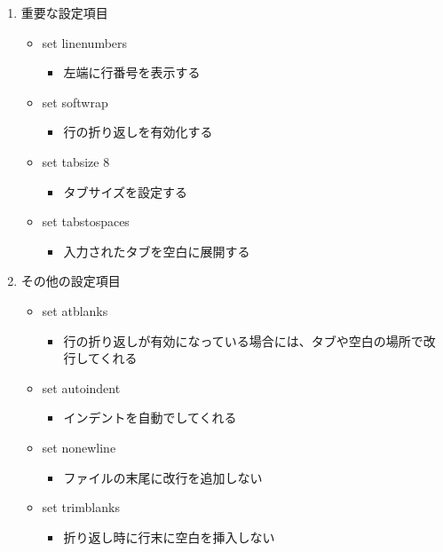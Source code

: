\documentclass[a4paper,10pt]{jsarticle}
\begin{document}
  \begin{enumerate}
    \item 重要な設定項目
    \begin{itemize}
      \item set linenumbers
      \begin{itemize}
        \item 左端に行番号を表示する
      \end{itemize}
      \item set softwrap
      \begin{itemize}
        \item 行の折り返しを有効化する
      \end{itemize}
      \item set tabsize 8
      \begin{itemize}
        \item タブサイズを設定する
      \end{itemize}
      \item set tabstospaces
      \begin{itemize}
        \item 入力されたタブを空白に展開する
      \end{itemize}
    \end{itemize}
    
    \item その他の設定項目
    \begin{itemize}
      \item set atblanks
      \begin{itemize}
        \item 行の折り返しが有効になっている場合には、タブや空白の場所で改行してくれる
      \end{itemize}
      \item set autoindent
      \begin{itemize}
        \item インデントを自動でしてくれる
      \end{itemize}
      \item set nonewline
      \begin{itemize}
        \item ファイルの末尾に改行を追加しない
      \end{itemize}
      \item set trimblanks
      \begin{itemize}
        \item 折り返し時に行末に空白を挿入しない
      \end{itemize}
    \end{itemize}
  \end{enumerate}
\end{document}
